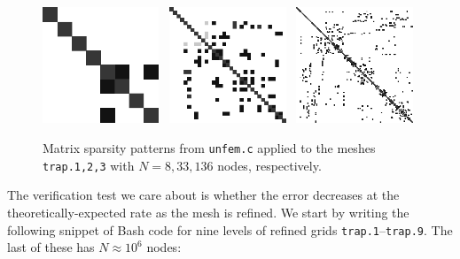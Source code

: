 \begin{figure}
\includegraphics[width=0.31\textwidth]{figs/trap1mat} \, \includegraphics[width=0.31\textwidth]{figs/trap2mat} \, \includegraphics[width=0.31\textwidth]{figs/trap3mat}
\caption{Matrix sparsity patterns from \texttt{unfem.c} applied to the meshes \texttt{trap.1,2,3} with $N=8,33,136$ nodes, respectively.}
\label{fig:un:unfem-matsparsity}
\end{figure}

The verification test we care about is whether the error decreases at the theoretically-expected rate as the mesh is refined.  We start by writing the following snippet of Bash code for nine levels of refined grids  \texttt{trap.1}--\texttt{trap.9}.  The last of these has $N\approx 10^6$ nodes:

